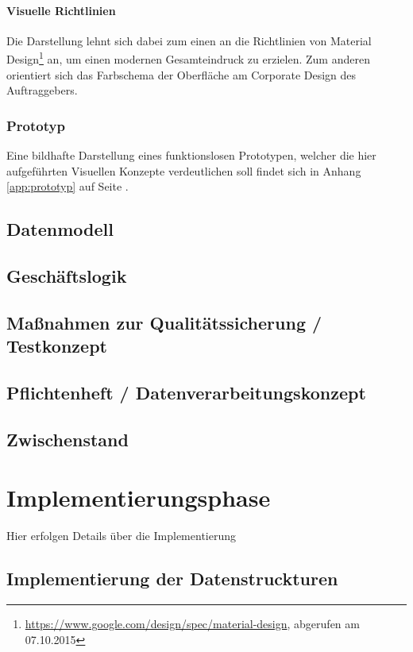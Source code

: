 \documentclass[12pt, xcolor=dvipsnames]{scrartcl}
\begin{document}
\paragraph{Visuelle Richtlinien}

Die Darstellung lehnt sich dabei zum einen an die Richtlinien von
Material Design\footnote{\url{https://www.google.com/design/spec/material-design}, abgerufen am 07.10.2015} an, um einen modernen Gesamteindruck zu erzielen.
Zum anderen orientiert sich das Farbschema der Oberfläche am Corporate Design des Auftraggebers.

\subsubsection{Prototyp}
Eine bildhafte Darstellung eines funktionslosen Prototypen, welcher die hier aufgeführten Visuellen Konzepte verdeutlichen soll findet sich in Anhang \ref{app:prototyp} auf Seite \pageref{app:prototyp}.

\subsection{Datenmodell}

\subsection{Geschäftslogik}

\subsection{Maßnahmen zur Qualitätssicherung / Testkonzept}

\subsection{Pflichtenheft / Datenverarbeitungskonzept}

\subsection{Zwischenstand}

\section{Implementierungsphase}

	Hier erfolgen Details über die Implementierung

\subsection{Implementierung der Datenstruckturen}
\end{document}
